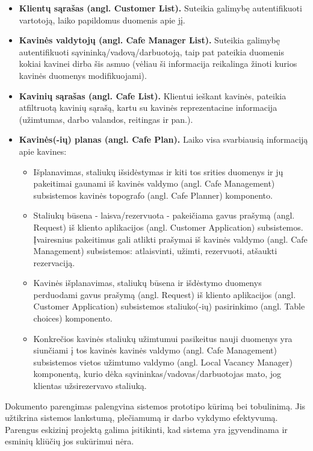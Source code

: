 \documentclass{VUMIFPSkursinis}
\begin{document}
{{{{{
\begin{itemize}
  \item \textbf{Klientų sąrašas (angl. Customer List).} Suteikia galimybę autentifikuoti vartotoją, laiko papildomus duomenis apie jį.
  \item \textbf{Kavinės valdytojų (angl. Cafe Manager List).} Suteikia galimybę autentifikuoti sąvininką/vadovą/darbuotoją, taip pat pateikia duomenis kokiai kavinei dirba šis asmuo (vėliau ši informacija reikalinga žinoti kurios kavinės duomenys modifikuojami).
  \item \textbf{Kavinių sąrašas (angl. Cafe List).} Klientui ieškant kavinės, pateikia atfiltruotą kavinių sąrašą, kartu su kavinės reprezentacine informacija (užimtumas, darbo valandos, reitingas ir pan.).
  \item \textbf{Kavinės(-ių) planas (angl. Cafe Plan).} Laiko visa svarbiausią informaciją apie kavines:
  	\begin{itemize}
  	\item Išplanavimas, staliukų išsidėstymas ir kiti tos srities duomenys ir jų pakeitimai gaunami iš kavinės valdymo (angl. Cafe Management) subsistemos kavinės topografo (angl. Cafe Planner) komponento.
  	\item Staliukų būsena - laisva/rezervuota - pakeičiama gavus prašymą (angl. Request) iš kliento aplikacijos (angl. Customer Application) subsistemos. Įvairesnius pakeitimus gali atlikti prašymai iš kavinės valdymo (angl. Cafe Management) subsistemos: atlaisvinti, užimti, rezervuoti, atšaukti rezervaciją.
  	\item Kavinės išplanavimas, staliukų būsena ir išdėstymo duomenys perduodami gavus prašymą (angl. Request) iš kliento aplikacijos (angl. Customer Application) subsistemos staliuko(-ių) pasirinkimo (angl. Table choices) komponento.
  	\item Konkrečios kavinės staliukų užimtumui pasikeitus nauji duomenys yra siunčiami į tos kavinės kavinės valdymo (angl. Cafe Management) subsistemos vietos užimtumo valdymo (angl. Local Vacancy Manager) komponentą, kurio dėka sąvininkas/vadovas/darbuotojas mato, jog klientas užsirezervavo staliuką.
  	\end{itemize}
\end{itemize}


Dokumento parengimas palengvina sistemos prototipo kūrimą bei tobulinimą. Jis užtikrina
sistemos lankstumą, plečiamumą ir darbo vykdymo efektyvumą. Parengus eskizinį projektą galima
įsitikinti, kad sistema yra įgyvendinama ir esminių kliūčių jos sukūrimui nėra.

}}}}}
\end{document}
